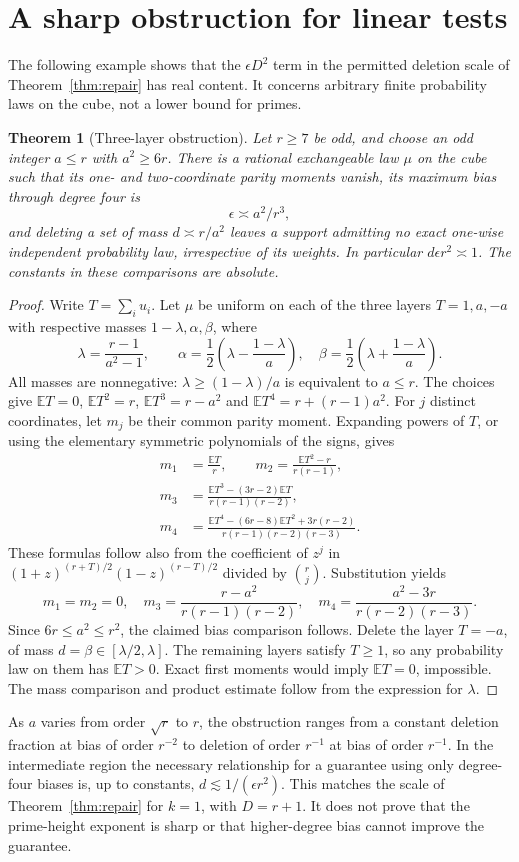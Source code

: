 \documentclass[11pt]{article}
\newtheorem{theorem}{Theorem}[section]
\theoremstyle{remark}\newtheorem{remark}[theorem]{Remark}
\newcommand{\E}{\mathbb E}
\begin{document}
\section{A sharp obstruction for linear tests}
The following example shows that the $\epsilon D^2$ term in the permitted deletion scale of Theorem~\ref{thm:repair} has real content. It concerns arbitrary finite probability laws on the cube, not a lower bound for primes.
\begin{theorem}[Three-layer obstruction]\label{thm:sharp}
Let $r\ge7$ be odd, and choose an odd integer $a\le r$ with $a^2\ge6r$. There is a rational exchangeable law $\mu$ on the cube such that its one- and two-coordinate parity moments vanish, its maximum bias through degree four is
\[
 \epsilon\asymp a^2/r^3,
\]
and deleting a set of mass $d\asymp r/a^2$ leaves a support admitting no exact one-wise independent probability law, irrespective of its weights. In particular $d\epsilon r^2\asymp1$. The constants in these comparisons are absolute.
\end{theorem}
\begin{proof}
Write $T=\sum_i u_i$. Let $\mu$ be uniform on each of the three layers $T=1,a,-a$ with respective masses $1-\lambda,\alpha,\beta$, where
\[
 \lambda=\frac{r-1}{a^2-1},\qquad
 \alpha=\frac12\left(\lambda-\frac{1-\lambda}{a}\right),\quad
 \beta=\frac12\left(\lambda+\frac{1-\lambda}{a}\right).
\]
All masses are nonnegative: $\lambda\ge(1-\lambda)/a$ is equivalent to $a\le r$. The choices give $\E T=0$, $\E T^2=r$, $\E T^3=r-a^2$ and $\E T^4=r+(r-1)a^2$. For $j$ distinct coordinates, let $m_j$ be their common parity moment. Expanding powers of $T$, or using the elementary symmetric polynomials of the signs, gives
\begin{align*}
 m_1&=\frac{\E T}{r},\qquad
 m_2=\frac{\E T^2-r}{r(r-1)},\\
 m_3&=\frac{\E T^3-(3r-2)\E T}{r(r-1)(r-2)},\\
 m_4&=\frac{\E T^4-(6r-8)\E T^2+3r(r-2)}{r(r-1)(r-2)(r-3)}.
\end{align*}
These formulas follow also from the coefficient of $z^j$ in $(1+z)^{(r+T)/2}(1-z)^{(r-T)/2}$ divided by $\binom rj$. Substitution yields
\[
 m_1=m_2=0,\quad m_3=\frac{r-a^2}{r(r-1)(r-2)},\quad
 m_4=\frac{a^2-3r}{r(r-2)(r-3)}.
\]
Since $6r\le a^2\le r^2$, the claimed bias comparison follows. Delete the layer $T=-a$, of mass $d=\beta\in[\lambda/2,\lambda]$. The remaining layers satisfy $T\ge1$, so any probability law on them has $\E T>0$. Exact first moments would imply $\E T=0$, impossible. The mass comparison and product estimate follow from the expression for $\lambda$.
\end{proof}
As $a$ varies from order $\sqrt r$ to $r$, the obstruction ranges from a constant deletion fraction at bias of order $r^{-2}$ to deletion of order $r^{-1}$ at bias of order $r^{-1}$. In the intermediate region the necessary relationship for a guarantee using only degree-four biases is, up to constants, $d\lesssim1/(\epsilon r^2)$. This matches the scale of Theorem~\ref{thm:repair} for $k=1$, with $D=r+1$. It does not prove that the prime-height exponent is sharp or that higher-degree bias cannot improve the guarantee.
\end{document}
